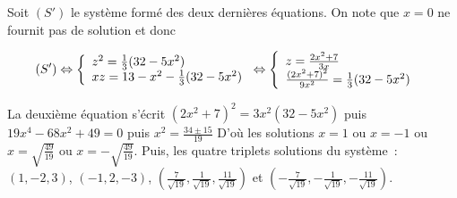 {{Soit $(S')$ le système formé des deux dernières équations. On note que $x=0$ ne fournit pas de solution et donc

\begin{align*}\ensuremath
(S')&\Leftrightarrow\left\{
\begin{array}{l}
z^2=\frac{1}{3}(32-5x^2)\\
xz=13-x^2-\frac{1}{3}(32-5x^2)
\end{array}
\right.\Leftrightarrow\left\{
\begin{array}{l}
z=\frac{2x^2+7}{3x}\\
\frac{(2x^2+7)^2}{9x^2}=\frac{1}{3}(32-5x^2)
\end{array}
\right.
\end{align*}

La deuxième équation s'écrit $(2x^2+7)^2=3x^2(32-5x^2)$ puis $19x^4-68x^2+49=0$ puis $x^2=\frac{34\pm15}{19}$
D'où les solutions $x=1$ ou $x=-1$ ou $x=\sqrt{\frac{49}{19}}$ ou $x=-\sqrt{\frac{49}{19}}$. Puis, les quatre triplets solutions du système~:~$(1,-2,3)$, $(-1,2,-3)$, $(\frac{7}{\sqrt{19}},\frac{1}{\sqrt{19}},\frac{11}{\sqrt{19}})$ et $(-\frac{7}{\sqrt{19}},-\frac{1}{\sqrt{19}},-\frac{11}{\sqrt{19}})$.
}
}

